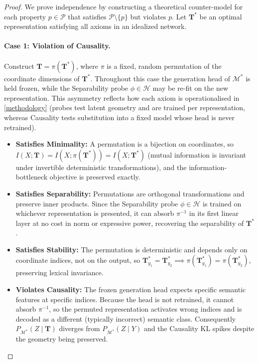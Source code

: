 \begin{proof}
We prove independence by constructing a theoretical counter-model for each property $p \in \mathcal{P}$ that satisfies $\mathcal{P} \setminus \{p\}$ but violates $p$. Let $\mathbf{T}^*$ be an optimal representation satisfying all axioms in an idealized network.

\paragraph{Case 1: Violation of Causality.}
Construct $\mathbf{T} = \pi(\mathbf{T}^*)$, where $\pi$ is a fixed, random permutation of the coordinate dimensions of $\mathbf{T}^*$. Throughout this case the generation head of $\mathcal{M}^*$ is held frozen, while the Separability probe $\phi \in \mathcal{H}$ may be re-fit on the new representation. This asymmetry reflects how each axiom is operationalised in \cref{methodology} (probes test latent geometry and are trained per representation, whereas Causality tests substitution into a fixed model whose head is never retrained).
\begin{itemize}
    \item \textbf{Satisfies Minimality:} A permutation is a bijection on coordinates, so $I(X; \mathbf{T}) = I(X; \pi(\mathbf{T}^*)) = I(X; \mathbf{T}^*)$ (mutual information is invariant under invertible deterministic transformations), and the information-bottleneck objective is preserved exactly.
    \item \textbf{Satisfies Separability:} Permutations are orthogonal transformations and preserve inner products. Since the Separability probe $\phi \in \mathcal{H}$ is trained on whichever representation is presented, it can absorb $\pi^{-1}$ in its first linear layer at no cost in norm or expressive power, recovering the separability of $\mathbf{T}^*$.
    \item \textbf{Satisfies Stability:} The permutation is deterministic and depends only on coordinate indices, not on the output, so $\mathbf{T}^*_{y_1} = \mathbf{T}^*_{y_2} \implies \pi(\mathbf{T}^*_{y_1}) = \pi(\mathbf{T}^*_{y_2})$, preserving lexical invariance.
    \item \textbf{Violates Causality:} The frozen generation head expects specific semantic features at specific indices. Because the head is not retrained, it cannot absorb $\pi^{-1}$, so the permuted representation activates wrong indices and is decoded as a different (typically incorrect) semantic class. Consequently $P_{\mathcal{M}^*}(Z \mid \mathbf{T})$ diverges from $P_{\mathcal{M}^*}(Z \mid Y)$ and the Causality KL spikes despite the geometry being preserved.
\end{itemize}


\end{proof}
